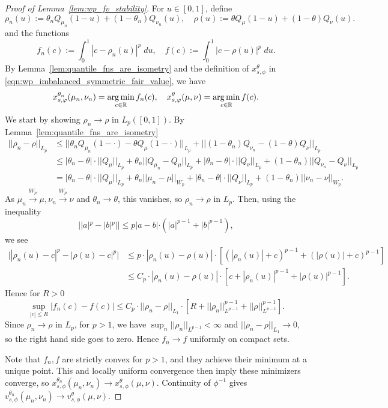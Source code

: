\begin{subappendices}
\begin{proof}[Proof of Lemma~\ref{lem:wp_fv_stability}]
     For $u \in [0,1]$, define
    \[\rho_n(u) := \theta_n Q_{\mu_n}(1-u) + (1-\theta_n) Q_{\nu_n}(u), \quad \rho(u) := \theta Q_{\mu}(1-u) + (1-\theta) Q_{\nu}(u).\]
    \noindent and the functions
    \[f_n(c) := \int_0^1 |c - \rho_n(u)|^p \; du, \quad f(c) := \int_0^1 |c - \rho(u)|^p \; du.\]
    \noindent By Lemma~\ref{lem:quantile_fns_are_isometry} and the definition of $x_{s,\phi}^\theta$ in \eqref{eqn:wp_imbalanced_symmetric_fair_value}, we have
    \[x_{s,\varphi}^{\theta_n}(\mu_n, \nu_n) = \operatorname*{arg\,min}_{c \in \mathbb R} f_n(c), \quad x_{s,\varphi}^{\theta}(\mu, \nu) = \operatorname*{arg\,min}_{c \in \mathbb R} f(c).\]
    \noindent We start by showing $\rho_n \to \rho$
    in $L_p([0,1])$. By Lemma~\ref{lem:quantile_fns_are_isometry}
    \begin{align*}
        ||\rho_n - \rho||_{L_p} & \leq ||\theta_n Q_{\mu_n}(1-\cdot) - \theta Q_{\mu}(1-\cdot)||_{L_p} + ||(1-\theta_n) Q_{\nu_n} - (1-\theta) Q_{\nu}||_{L_p} \\[5pt]
        & \leq |\theta_n - \theta| \cdot ||Q_{\mu}||_{L_p} + \theta_n || Q_{\mu_n} - Q_{\mu} ||_{L_p} + |\theta_n - \theta| \cdot ||Q_{\nu}||_{L_p} + (1-\theta_n) || Q_{\nu_n} - Q_{\nu} ||_{L_p} \\[5pt]
        & = |\theta_n - \theta| \cdot ||Q_{\mu}||_{L_p} + \theta_n ||\mu_n - \mu||_{W_p} + |\theta_n - \theta| \cdot ||Q_{\nu}||_{L_p} + (1-\theta_n) ||\nu_n - \nu||_{W_p}.
    \end{align*}
    \noindent As $\mu_n \xrightarrow{W_p} \mu, \nu_n \xrightarrow{W_p} \nu$ and $\theta_n \to \theta$,
    this vanishes, so $\rho_n \to \rho$ in $L_p$. Then, using the inequality
    \[||a|^p - |b|^p|| \leq p |a-b| \cdot (|a|^{p-1} + |b|^{p-1}),\]
    \noindent we see
    \begin{align*}
        \Big| |\rho_n(u) - c|^p - |\rho(u) - c|^p\Big| & \leq p \cdot |\rho_n(u) - \rho(u)| \cdot \left[(|\rho_n(u)| +c)^{p-1} + (|\rho(u)| + c)^{p-1}\right]\\
        & \leq C_p \cdot |\rho_n(u) - \rho(u)| \cdot \left[c + |\rho_n(u)|^{p-1} + |\rho(u)|^{p-1}\right].
    \end{align*}
    \noindent Hence for $R > 0$
    \[\sup_{|c| \leq R} |f_n(c) - f(c)| \leq C_p \cdot ||\rho_n - \rho||_{L_1} \cdot \left[R + ||\rho_n||_{L^{p-1}}^{p-1} + ||\rho||_{L^{p-1}}^{p-1}\right].\]
    \noindent Since $\rho_n \to \rho$ in $L_p$, for $p > 1$, we have $\sup_n ||\rho_n||_{L^{p-1}} < \infty$ and $||\rho_n - \rho||_{L_1} \to 0$, so the right hand
    side goes to zero. Hence $f_n \to f$ uniformly on compact sets.

    Note that $f_n, f$ are strictly convex for $p > 1$, and they achieve their minimum at a
    unique point. This and locally uniform convergence then imply these minimizers converge,
    so $x_{s,\phi}^{\theta_n}(\mu_n,\nu_n)\to x_{s,\phi}^{\theta}(\mu,\nu)$. Continuity of $\phi^{-1}$ gives $v_{s,\phi}^{\theta_n}(\mu_n,\nu_n)\to v_{s,\phi}^{\theta}(\mu,\nu)$. 
\end{proof}

\end{subappendices}

